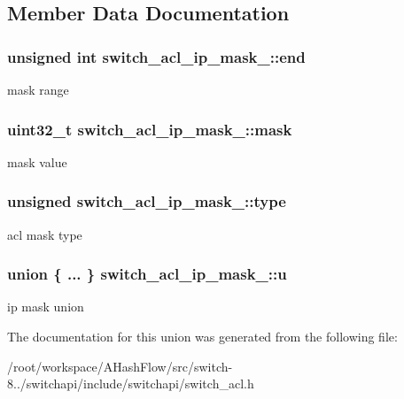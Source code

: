 \subsection{Member Data Documentation}
\hypertarget{unionswitch__acl__ip__mask___a2c7c173d9f4b2086daaf117a04acf83d}{
\subsubsection[{end}]{\setlength{\rightskip}{0pt plus 5cm}unsigned int switch\+\_\+acl\+\_\+ip\+\_\+mask\+\_\+\+::end}}\label{unionswitch__acl__ip__mask___a2c7c173d9f4b2086daaf117a04acf83d}
mask range \hypertarget{unionswitch__acl__ip__mask___a83ee753dcae5e72f95fab067092f1ca4}{
\subsubsection[{mask}]{\setlength{\rightskip}{0pt plus 5cm}uint32\+\_\+t switch\+\_\+acl\+\_\+ip\+\_\+mask\+\_\+\+::mask}}\label{unionswitch__acl__ip__mask___a83ee753dcae5e72f95fab067092f1ca4}
mask value \hypertarget{unionswitch__acl__ip__mask___aaa4a09473f24932a646f12db7536e6fa}{
\subsubsection[{type}]{\setlength{\rightskip}{0pt plus 5cm}unsigned switch\+\_\+acl\+\_\+ip\+\_\+mask\+\_\+\+::type}}\label{unionswitch__acl__ip__mask___aaa4a09473f24932a646f12db7536e6fa}
acl mask type \hypertarget{unionswitch__acl__ip__mask___a53c715f04e56916d7bd4cb3a16eda123}{
\subsubsection[{u}]{\setlength{\rightskip}{0pt plus 5cm}union \{ ... \}   switch\+\_\+acl\+\_\+ip\+\_\+mask\+\_\+\+::u}}\label{unionswitch__acl__ip__mask___a53c715f04e56916d7bd4cb3a16eda123}
ip mask union 

The documentation for this union was generated from the following file\+:\begin{DoxyCompactItemize}
\item 
/root/workspace/\+A\+Hash\+Flow/src/switch-\/8../switchapi/include/switchapi/switch\+\_\+acl.\+h\end{DoxyCompactItemize}
